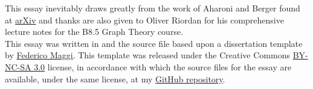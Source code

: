 \begin{acky}
\noindent This essay inevitably draws greatly from the work of Aharoni and Berger found at \href{http://arxiv.org/pdf/math/0509397.pdf}{arXiv} and thanks are also given to Oliver Riordan for his comprehensive lecture notes for the B8.5 Graph Theory course.\\

\noindent This essay was written in \XeLaTeX and the source file based upon a dissertation template by \href{http://www.latextemplates.com/template/maggi-memoir-thesis}{Federico Maggi}. This template was released under the Creative Commons \href{https://creativecommons.org/licenses/by-nc-sa/3.0/}{BY-NC-SA 3.0} license, in accordance with which the source files for the essay are available, under the same license, at my \href{https://github.com/sjt12/Menger}{GitHub repository}.
\end{acky}